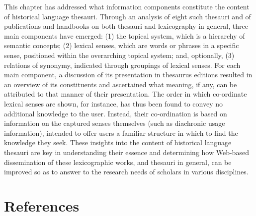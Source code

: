 This chapter has addressed what information components constitute the content of historical language thesauri. Through an analysis of eight such thesauri and of publications and handbooks on both thesauri and lexicography in general, three main components have emerged: (1) the topical system, which is a hierarchy of semantic concepts; (2) lexical senses, which are words or phrases in a specific sense, positioned within the overarching topical system; and, optionally, (3) relations of synonymy, indicated through
groupings of lexical senses. 
For each main component, a discussion of its presentation in thesaurus editions resulted in an overview of its constituents and ascertained what meaning, if any, can be attributed to that manner of their presentation. 
The order in which co-ordinate lexical senses are shown, for instance, has thus been found to convey no additional knowledge to the user. Instead, their co-ordination is based on information on the captured senses themselves (such as diachronic usage information), intended to offer users a familiar structure in which to find the knowledge they seek. 
These insights into the content of historical language thesauri are key in understanding their essence and determining how Web-based dissemination of these lexicographic works, and thesauri in general, can be improved so as to answer to the research needs of scholars in various disciplines.



\section*{References}

